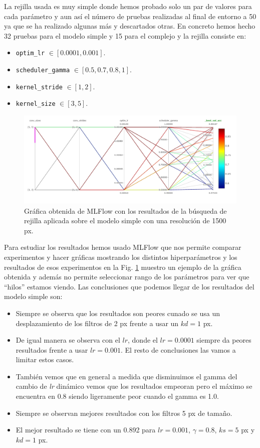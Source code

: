 \documentclass[a4paper,12pt,twoside,titlepage]{article}
\newcommand{\inline}[1]{\texttt{#1}}
\begin{document}
La rejilla usada es muy simple donde hemos probado solo un par de valores para cada parámetro y aun así el número de pruebas realizadas al final de entorno a 50 ya que se ha realizado algunas más y descartados otras. En concreto hemos hecho 32 pruebas para el modelo simple y 15 para el complejo y la rejilla consiste en:
\begin{itemize}
  \item \inline{optim_lr} $\in \left[0.0001, 0.001\right]$.
  \item \inline{scheduler_gamma} $\in \left[0.5, 0.7, 0.8, 1\right]$.
  \item \inline{kernel_stride} $\in \left[1, 2\right]$.
  \item \inline{kernel_size} $\in \left[3, 5\right]$.
\end{itemize}

\begin{figure}[h!]
  \centering
  \includegraphics[scale=0.65, center]{studio_kernel_simple.PNG}
  \caption{Gráfica obtenida de MLFlow con los resultados de la búsqueda de rejilla aplicada sobre el modelo simple con una resolución de 1500 px.}
  \label{fig:estudio_kernel}
\end{figure}


Para estudiar los resultados hemos usado MLFlow que nos permite comparar experimentos y hacer gráficas mostrando los distintos hiperparámetros y los resultados de esos experimentos en la Fig. \ref{fig:estudio_kernel} muestro un ejemplo de la gráfica obtenida y además no permite seleccionar rango de los parámetros para ver que ``hilos'' estamos viendo. Las conclusiones que podemos llegar de los resultados del modelo simple son:
\begin{itemize}
  \item Siempre se observa que los resultados son peores cunado se usa un desplazamiento de los filtros de 2 px frente a usar un $kd = 1$ px.
  \item De igual manera se observa con el $lr$, donde el $lr = 0.0001$ siempre da peores resultados frente a usar $lr = 0.001$. El resto de conclusiones las vamos a limitar estos casos.
  \item También vemos que en general a medida que disminuimos el gamma del cambio de \textit{lr} dinámico vemos que los resultados empeoran pero el máximo se encuentra en 0.8 siendo ligeramente peor cuando el gamma es 1.0.
  \item Siempre se observan mejores resultados con los filtros 5 px de tamaño. 
  \item El mejor resultado se tiene con un 0.892 para $lr = 0.001$, $\gamma = 0.8$, $ks = 5$ px y $kd = 1$ px.
\end{itemize}
\end{document}
